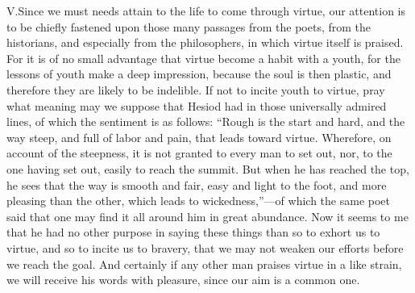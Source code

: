 \documentclass[a4paper]{article}
\begin{document}
\bigskip

\lettrine[lines=3, findent=3pt, nindent=0pt]{V.} Since we must needs attain to the life to come through virtue, our attention is to be chiefly fastened upon those many passages from the poets, from the historians, and especially from the philosophers, in which virtue itself is praised. For it is of no small advantage that virtue become a habit with a youth, for the lessons of youth make a deep impression, because the soul is then plastic, and therefore they are likely to be indelible. If not to incite youth to virtue, pray what meaning may we suppose that Hesiod had in those universally admired lines, of which the sentiment is as follows: ``Rough is the start and hard, and the way steep, and full of labor and pain, that leads toward virtue. Wherefore, on account of the steepness, it is not granted to every man to set out, nor, to the one having set out, easily to reach the summit. But when he has reached the top, he sees that the way is smooth and fair, easy and light to the foot, and more pleasing than the other, which leads to wickedness,''—of which the same poet said that one may find it all around him in great abundance. Now it seems to me that he had no other purpose in saying these things than so to exhort us to virtue, and so to incite us to bravery, that we may not weaken our efforts before we reach the goal. And certainly if any other man praises virtue in a like strain, we will receive his words with pleasure, since our aim is a common one.
\end{document}
